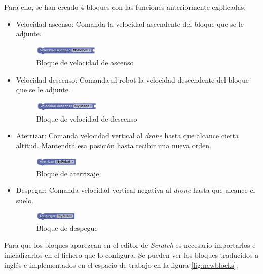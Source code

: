 Para ello, se han creado 4 bloques con las funciones anteriormente explicadas: 
\begin{itemize}
    \item Velocidad ascenso: Comanda la velocidad ascendente del bloque que se le adjunte. 
    \begin{figure}[H]
        \centering
        \includegraphics[width=0.3\textwidth]{img/ascensionBlockly.png}
        \caption{Bloque de velocidad de ascenso} \label{fig:ascension}
    \end{figure}
    
    \item Velocidad descenso: Comanda al robot la velocidad descendente del bloque que se le adjunte. 
    \begin{figure}[H]
        \centering
        \includegraphics[width=0.3\textwidth]{img/descensoBlockly.png}
        \caption{Bloque de velocidad de descenso} \label{fig:descenso}
    \end{figure}
    \item Aterrizar: Comanda velocidad vertical al \textit{drone} hasta que alcance cierta altitud. Mantendrá esa posición hasta recibir una nueva orden.
    \begin{figure}[H]
        \centering
        \includegraphics[width=0.2\textwidth]{img/aterrizarBlockly.png}
        \caption{Bloque de aterrizaje} \label{fig:aterrizaje}
    \end{figure}
    \item Despegar: Comanda velocidad vertical negativa al \textit{drone} hasta que alcance el suelo. 
        \begin{figure}[H]
            \centering
            \includegraphics[width=0.2\textwidth]{img/despegarBlockly.png}
            \caption{Bloque de despegue} \label{fig:despegar}
        \end{figure}
\end{itemize}

Para que los bloques aparezcan en el editor de \textit{Scratch} es necesario importarlos e inicializarlos en el fichero que lo configura. Se pueden ver los bloques traducidos a inglés e implementados en el espacio de trabajo en la figura {\ref{fig:newblocks}}.

